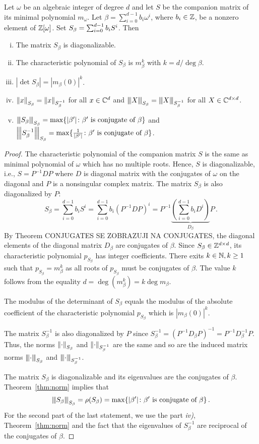 \begin{lem}
\label{lem:propertiesSbeta}
Let $\omega$ be an algebraic integer of degree $d$ and let $S$ be the companion matrix of its minimal polynomial $m_\omega$. Let $\beta=\sum_{i=0}^{d-1} b_i \omega^i$, where $b_i \in \mathbb{Z}$, be a nonzero element of $\mathbb{Z}[\omega]$. Set $S_\beta=\sum_{i=0}^{d-1} {b}_i S^i$. Then
\begin{enumerate}[i)]
   \item The matrix $S_\beta$ is diagonalizable.
   \item The characteristic polynomial of $S_\beta$ is $m_\beta^k$ with $k=d / \deg \beta$.
   \item $|\det S_\beta|=|m_\beta(0)|^k$.
   \item $\left\lVert x\right\rVert_{S_\beta}=\left\lVert x\right\rVert_{S_\beta^{-1}}$ for all $x \in \mathbb{C}^d$ and ${\left\vert\kern-0.25ex\left\vert\kern-0.25ex\left\vert X\right\vert\kern-0.25ex\right\vert\kern-0.25ex\right\vert}_{S_\beta}={\left\vert\kern-0.25ex\left\vert\kern-0.25ex\left\vert X\right\vert\kern-0.25ex\right\vert\kern-0.25ex\right\vert}_{S_\beta^{-1}}$ for all $X \in \mathbb{C}^{d\times d}$.
   \item ${\left\vert\kern-0.25ex\left\vert\kern-0.25ex\left\vert S_\beta\right\vert\kern-0.25ex\right\vert\kern-0.25ex\right\vert}_{S_\beta}=\max \{|\beta'| \colon \beta' \text{ is conjugate of } \beta\}$ and $ {\left\vert\kern-0.25ex\left\vert\kern-0.25ex\left\vert S_\beta^{-1}\right\vert\kern-0.25ex\right\vert\kern-0.25ex\right\vert}_{S_\beta}=\max \{\frac{1}{|\beta'|} \colon \beta' \text{ is conjugate of } \beta\}$.
\end{enumerate}  
\end{lem}
\begin{proof}
The characteristic polynomial of the companion matrix $S$ is the same as minimal polynomial of $\omega$ which has no multiple roots. Hence, $S$ is diagonalizable, i.e., $S=P^{-1}DP$ where $D$ is diagonal matrix with the conjugates of $\omega$ on the diagonal and $P$ is a nonsingular complex matrix. The matrix $S_\beta$ is also diagonalized by $P$:
$$
S_\beta=\sum_{i=0}^{d-1} b_i S^i= \sum_{i=0}^{d-1} b_i \left(P^{-1}DP\right)^i=P^{-1}\underbrace{\left(\sum_{i=0}^{d-1} b_i D^i\right)}_{D_\beta}P\,.
$$
By Theorem CONJUGATES SE ZOBRAZUJI NA CONJUGATES, the diagonal elements of the diagonal matrix $D_\beta$ are conjugates of $\beta$. Since $S_\beta\in\mathbb{Z}^{d\times d}$, its characteristic polynomial $p_{S_\beta}$ has integer coefficients. There exits $k\in\mathbb{N}, k\geq 1$ such that $p_{S_\beta}=m^k_\beta$ as all roots of $p_{S_\beta}$ must be conjugates of $\beta$. The value $k$ follows from the equality $d=\deg(m_\beta^k)=k \deg m_\beta$. 

The modulus of the determinant of $S_\beta$ equals the modulus of the absolute coefficient of the characteristic polynomial $p_{S_\beta}$ which is $|m_\beta(0)|^k$.

The matrix $S_\beta^{-1}$ is also diagonalized by $P$ since $S_\beta^{-1}=(P^{-1}D_\beta P)^{-1}=P^{-1}D_\beta^{-1}P$. Thus, the norms $\left\lVert\cdot\right\rVert_{S_\beta}$ and $\left\lVert\cdot\right\rVert_{S_\beta^{-1}}$ are the same and so are the induced matrix norms ${\left\vert\kern-0.25ex\left\vert\kern-0.25ex\left\vert \cdot\right\vert\kern-0.25ex\right\vert\kern-0.25ex\right\vert}_{S_\beta}$ and ${\left\vert\kern-0.25ex\left\vert\kern-0.25ex\left\vert \cdot\right\vert\kern-0.25ex\right\vert\kern-0.25ex\right\vert}_{S_\beta^{-1}}$.

The matrix $S_\beta$ is diagonalizable and its eigenvalues are the conjugates of $\beta$. Theorem~\ref{thm:norm} implies that 
$$
{\left\vert\kern-0.25ex\left\vert\kern-0.25ex\left\vert S_\beta\right\vert\kern-0.25ex\right\vert\kern-0.25ex\right\vert}_{S_\beta}=\rho(S_\beta)= \max \{|\beta'| \colon \beta' \text{ is conjugate of } \beta\}\,. 
$$
For the second part of the last statement, we use the part \textit{iv)}, Theorem~\ref{thm:norm} and the fact that the eigenvalues of $S_\beta^{-1}$ are  reciprocal of the conjugates of $\beta$.
\end{proof}

